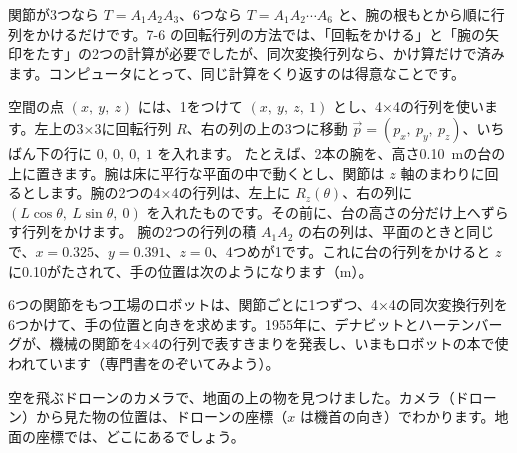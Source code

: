 関節が3つなら $T=A_1A_2A_3$、6つなら $T=A_1A_2\cdots A_6$ と、腕の根もとから順に行列をかけるだけです。7-6 の回転行列の方法では、「回転をかける」と「腕の矢印をたす」の2つの計算が必要でしたが、同次変換行列なら、かけ算だけで済みます。コンピュータにとって、同じ計算をくり返すのは得意なことです。


\label{bk:7-7:yon}空間の点 $(x,\ y,\ z)$ には、1をつけて $(x,\ y,\ z,\ 1)$ とし、4×4の行列を使います。左上の3×3に回転行列 $R$、右の列の上の3つに移動 $\vec p=(p_x,\ p_y,\ p_z)$、いちばん下の行に $0,\ 0,\ 0,\ 1$ を入れます。
たとえば、2本の腕を、高さ\qty{0.10}{m}の台の上に置きます。腕は床に平行な平面の中で動くとし、関節は $z$ 軸のまわりに回るとします。腕の2つの4×4の行列は、左上に $R_z(\theta)$、右の列に $(L\cos\theta,\ L\sin\theta,\ 0)$ を入れたものです。その前に、台の高さの分だけ上へずらす行列をかけます。
腕の2つの行列の積 $A_1A_2$ の右の列は、平面のときと同じで、$x=0.325$、$y=0.391$、$z=0$、4つめが1です。これに台の行列をかけると $z$ に0.10がたされて、手の位置は次のようになります（m）。

6つの関節をもつ工場のロボットは、関節ごとに1つずつ、4×4の同次変換行列を6つかけて、手の位置と向きを求めます。1955年に、デナビットとハーテンバーグが、機械の関節を4×4の行列で表すきまりを発表し、いまもロボットの本で使われています（専門書をのぞいてみよう）。


\label{bk:7-7:camera}空を飛ぶドローンのカメラで、地面の上の物を見つけました。カメラ（ドローン）から見た物の位置は、ドローンの座標（$x$ は機首の向き）でわかります。地面の座標では、どこにあるでしょう。

